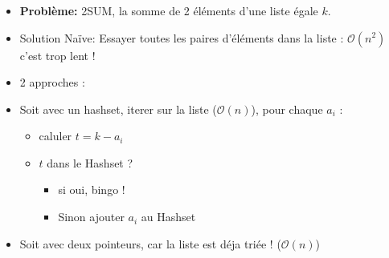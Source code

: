 \begin{frame}
    \frametitle{\problemtitle}
    \begin{itemize}
        \item<+-> \textbf{Problème:} 2SUM, la somme de 2 éléments d'une liste égale $k$.
        \item<+-> Solution Na\"ive: Essayer toutes les paires d'éléments dans la liste : $\mathcal O(n^2)$ c'est trop lent !
        \item<+-> 2 approches :
        \item<+-> Soit avec un hashset, iterer sur la liste ($\mathcal O(n)$), pour chaque $a_i$ :
        \begin{itemize}
            \item<+-> caluler $t = k - a_i$
            \item<+-> $t$ dans le Hashset ?
            \begin{itemize}
                \item si oui, bingo !
                \item Sinon ajouter $a_i$ au Hashset
            \end{itemize}
        \end{itemize}
        \item<+-> Soit avec deux pointeurs, car la liste est déja triée ! ($\mathcal O(n)$)
    \end{itemize}
    \solvestats
\end{frame}

